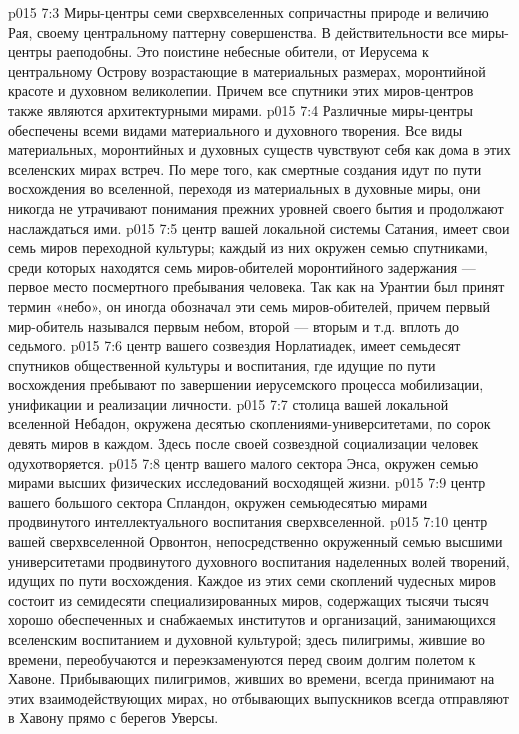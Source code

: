 \vs p015 7:3 \pc Миры\hyp{}центры семи сверхвселенных сопричастны природе и величию Рая, своему центральному паттерну совершенства. В действительности все миры\hyp{}центры раеподобны. Это поистине небесные обители, от Иерусема к центральному Острову возрастающие в материальных размерах, моронтийной красоте и духовном великолепии. Причем все спутники этих миров\hyp{}центров также являются архитектурными мирами.
\vs p015 7:4 Различные миры\hyp{}центры обеспечены всеми видами материального и духовного творения. Все виды материальных, моронтийных и духовных существ чувствуют себя как дома в этих вселенских мирах встреч. По мере того, как смертные создания идут по пути восхождения во вселенной, переходя из материальных в духовные миры, они никогда не утрачивают понимания прежних уровней своего бытия и продолжают наслаждаться ими.
\vs p015 7:5 \pc {} центр вашей локальной системы Сатания, имеет свои семь миров переходной культуры; каждый из них окружен семью спутниками, среди которых находятся семь миров\hyp{}обителей моронтийного задержания --- первое место посмертного пребывания человека. Так как на Урантии был принят термин «небо», он иногда обозначал эти семь миров\hyp{}обителей, причем первый мир\hyp{}обитель назывался первым небом, второй --- вторым и т.д. вплоть до седьмого.
\vs p015 7:6 \pc {} центр вашего созвездия Норлатиадек, имеет семьдесят спутников общественной культуры и воспитания, где идущие по пути восхождения пребывают по завершении иерусемского процесса мобилизации, унификации и реализации личности.
\vs p015 7:7 \pc {} столица вашей локальной вселенной Небадон, окружена десятью скоплениями\hyp{}университетами, по сорок девять миров в каждом. Здесь после своей созвездной социализации человек одухотворяется.
\vs p015 7:8 \pc {} центр вашего малого сектора Энса, окружен семью мирами высших физических исследований восходящей жизни.
\vs p015 7:9 \pc {} центр вашего большого сектора Спландон, окружен семьюдесятью мирами продвинутого интеллектуального воспитания сверхвселенной.
\vs p015 7:10 \pc {} центр вашей сверхвселенной Орвонтон, непосредственно окруженный семью высшими университетами продвинутого духовного воспитания наделенных волей творений, идущих по пути восхождения. Каждое из этих семи скоплений чудесных миров состоит из семидесяти специализированных миров, содержащих тысячи тысяч хорошо обеспеченных и снабжаемых институтов и организаций, занимающихся вселенским воспитанием и духовной культурой; здесь пилигримы, жившие во времени, переобучаются и переэкзаменуются перед своим долгим полетом к Хавоне. Прибывающих пилигримов, живших во времени, всегда принимают на этих взаимодействующих мирах, но отбывающих выпускников всегда отправляют в Хавону прямо с берегов Уверсы.
